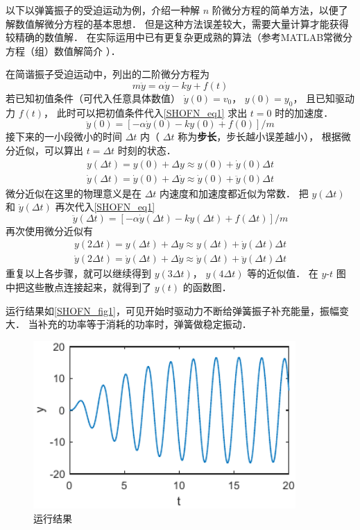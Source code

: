 

以下以弹簧振子的受迫运动为例，介绍一种解 $n$ 阶微分方程的简单方法，以便了解数值解微分方程的基本思想． 但是这种方法误差较大，需要大量计算才能获得较精确的数值解． 在实际运用中已有更复杂更成熟的算法（参考MATLAB常微分方程（组）数值解简介%
）．

在简谐振子受迫运动中，列出的二阶微分方程为
\begin{equation}\label{SHOFN_eq1}
m\ddot y = \alpha \dot y - ky + f(t)
\end{equation}
若已知初值条件（可代入任意具体数值） $\dot y(0) = v_0$，  $y(0) = y_0$， 且已知驱动力 $f(t)$， 此时可以把初值条件代入\autoref{SHOFN_eq1} 求出 $t = 0$ 时的加速度．
\begin{equation}
\ddot y(0) = [- \alpha \dot y(0) - ky(0) + f(0)]/m
\end{equation}
接下来的一小段微小的时间 $\Delta t$ 内（ $\Delta t$ 称为\textbf{步长}，步长越小误差越小）， 根据微分近似，可以算出 $t = \Delta t$ 时刻的状态．
\begin{gather}
y(\Delta t) =  y(0) + \Delta y \approx y(0) + \dot y(0) \Delta t\\
\dot y(\Delta t) = \dot y(0) + \Delta \dot y \approx \dot y(0) + \ddot y(0) \Delta t
\end{gather}
微分近似在这里的物理意义是在 $\Delta t$ 内速度和加速度都近似为常数． 把 $y(\Delta t)$ 和 $\dot y(\Delta t)$ 再次代入\autoref{SHOFN_eq1}
\begin{equation}
\ddot y(\Delta t) = [- \alpha \dot y(\Delta t) - ky(\Delta t) + f(\Delta t)]/m
\end{equation}
再次使用微分近似有
\begin{gather}
y(2\Delta t) =  y(\Delta t) + \Delta y \approx y(\Delta t) + \dot y(\Delta t) \Delta t\\
\dot y(2\Delta t) = \dot y(\Delta t) + \Delta \dot y \approx \dot y(\Delta t) + \ddot y(\Delta t) \Delta t
\end{gather}
重复以上各步骤，就可以继续得到 $y(3\Delta t)$，  $y(4\Delta t)$ 等的近似值． 在 $y$-$t$ 图中把这些散点连接起来，就得到了 $y(t)$ 的函数图．


运行结果如\autoref{SHOFN_fig1}，可见开始时驱动力不断给弹簧振子补充能量，振幅变大． 当补充的功率等于消耗的功率时，弹簧做稳定振动．
\begin{figure}[ht]
\centering
\includegraphics[width=10cm]{./figures/SHOFN1.pdf}
\caption{运行结果}\label{SHOFN_fig1}
\end{figure}











